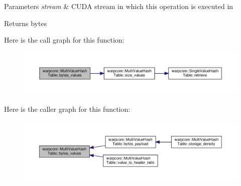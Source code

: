 \begin{DoxyParams}{Parameters}
{\em stream} & C\+U\+DA stream in which this operation is executed in \\
\hline
\end{DoxyParams}
\begin{DoxyReturn}{Returns}
bytes 
\end{DoxyReturn}
Here is the call graph for this function\+:
\nopagebreak
\begin{figure}[H]
\begin{center}
\leavevmode
\includegraphics[width=350pt]{classwarpcore_1_1MultiValueHashTable_a158b338a5c798cc0775fd8874bc6e571_cgraph}
\end{center}
\end{figure}
Here is the caller graph for this function\+:
\nopagebreak
\begin{figure}[H]
\begin{center}
\leavevmode
\includegraphics[width=350pt]{classwarpcore_1_1MultiValueHashTable_a158b338a5c798cc0775fd8874bc6e571_icgraph}
\end{center}
\end{figure}
\mbox{\label{classwarpcore_1_1MultiValueHashTable_a2191f42810234e459bc4ef6e491ec929}} 
